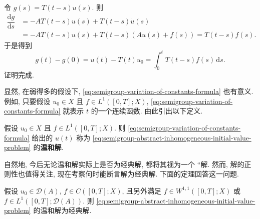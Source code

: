 \begin{Proof}
令 $g(s)=T(t-s)u(s)$. 则
\begin{equation}\label{eq:semigroup-variation-of-constants-proof-derivative}
\begin{aligned}\dfrac{\mathrm{d}g}{\mathrm{d}s}&=-AT(t-s)u(s)+T(t-s)\dot u(s)\\&=-AT(t-s)u(s)+T(t-s)(Au(s)+f(s))=T(t-s)f(s).\end{aligned}
\end{equation}
于是得到
\begin{equation}\label{eq:semigroup-variation-of-constants-proof-integral}
g(t)-g(0)=u(t)-T(t)u_0=\int_0^t T(t-s)f(s)\,\mathrm{d}s.
\end{equation}
证明完成.
\end{Proof}

显然, 在弱得多的假设下, \eqref{eq:semigroup-variation-of-constants-formula} 也有意义. 例如, 只要假设 $u_0\in X$ 且 $f\in L^1([0,T];X)$, \eqref{eq:semigroup-variation-of-constants-formula} 就表示 $t$ 的一个连续函数. 由此引出以下定义.

\begin{Definition}
\label{def:semigroup-mild-solution}
假设 $u_0\in X$ 且 $f\in L^1([0,T];X)$. 则 \eqref{eq:semigroup-variation-of-constants-formula} 给出的 $u(t)$ 称为 \eqref{eq:semigroup-abstract-inhomogeneous-initial-value-problem} 的\textbf{温和解}.
\end{Definition}

自然地, 今后无论温和解实际上是否为经典解, 都将其视为一个 ``解\textquotesingle\textquotesingle. 然而, 解的正则性也值得关注, 现在考察何时能断言解为经典解. 下面的定理回答这一问题.

\begin{Theorem}
\label{thm:semigroup-mild-solution-classical-regularity}
假设 $u_0\in\mathcal{D}(A)$, $f\in C([0,T];X)$, 且另外满足 $f\in W^{1,1}([0,T];X)$ 或 $f\in L^1([0,T];\mathcal{D}(A))$. 则 \eqref{eq:semigroup-abstract-inhomogeneous-initial-value-problem} 的温和解为经典解.
\end{Theorem}

